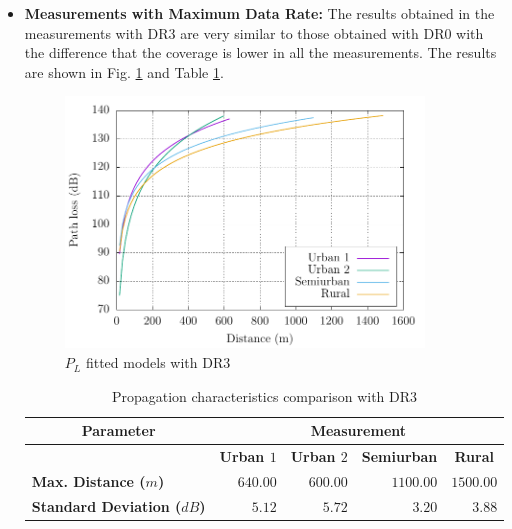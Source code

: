 \begin{itemize}
\item \textbf{Measurements with Maximum Data Rate:} The results obtained in the measurements with DR$3$ are very similar to those obtained with DR$0$ with the difference that the coverage is lower in all the measurements. The results are shown in Fig. \ref{fig:allfitteddr3} and Table \ref{tab:propagationcomparisondr3}.

\noindent
\begin{figure}[h!]
  \centering
  \includegraphics[width=0.9\textwidth]{Figure9}
  \caption{$P_L$ fitted models with DR$3$}
  \label{fig:allfitteddr3}
\end{figure}


\begin{table}[h!]
\centering
\caption{Propagation characteristics comparison with DR$3$}
\label{tab:propagationcomparisondr3}
\begin{tabular}{@{}lrrrr@{}}
\toprule
\multicolumn{1}{c}{Parameter} & \multicolumn{4}{c}{\textbf{Measurement}}                                                                                          \\ \midrule
\textbf{}                              & \multicolumn{1}{c}{\textbf{Urban $1$}} & \multicolumn{1}{c}{\textbf{Urban $2$}} & \multicolumn{1}{c}{\textbf{Semiurban}} & \multicolumn{1}{c}{\textbf{Rural}} \\
\textbf{Max. Distance ($m$)}             & $640.00$                            & $600.00$                            & $1100.00$                           & $1500.00$                           \\
\textbf{Standard Deviation ($dB$)}       & $5.12$                           & $5.72$                           & $3.20$                           & $3.88$                           \\ \bottomrule
\end{tabular}
\end{table}

\end{itemize}


